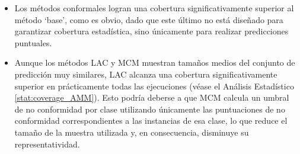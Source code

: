 \begin{itemize}
    
    \item Los métodos conformales logran una cobertura significativamente superior al método `base', como es obvio, dado que este último no está diseñado para garantizar cobertura estadística, sino únicamente para realizar predicciones puntuales.
    
    \item Aunque los métodos LAC y MCM muestran tamaños medios del conjunto de predicción muy similares, LAC alcanza una cobertura significativamente superior en prácticamente todas las ejecuciones (véase el Análisis Estadístico \ref{stat:coverage_AMM}). Esto podría deberse a que MCM calcula un umbral de no conformidad por clase utilizando únicamente las puntuaciones de no conformidad correspondientes a las instancias de esa clase, lo que reduce el tamaño de la muestra utilizada y, en consecuencia, disminuye su representatividad. 

\end{itemize}


